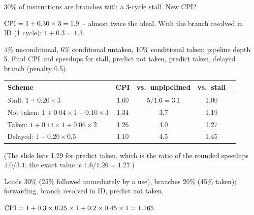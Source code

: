 \documentclass[11pt]{article}
\begin{document}
\begin{exercise}
30\% of instructions are branches with a 3-cycle stall. New CPI?
\end{exercise}
\begin{solution}
$\mathrm{CPI} = 1 + 0.30\times3 = 1.9$ -- almost twice the ideal. With the branch
resolved in ID (1 cycle): $1+0.3 = 1.3$.
\end{solution}

\begin{exercise}
4\% unconditional, 6\% conditional untaken, 10\% conditional taken;
pipeline depth 5. Find CPI and speedups for stall, predict not taken,
predict taken, delayed branch (penalty 0.5).
\end{exercise}
\begin{solution}
\begin{tabular}[t]{@{}lcccc@{}}
Scheme & CPI & vs.\ unpipelined & vs.\ stall \\
\hline
Stall: $1+0.20\times3$ & 1.60 & $5/1.6=3.1$ & 1.00 \\
Not taken: $1+0.04\times1+0.10\times3$ & 1.34 & 3.7 & 1.19 \\
Taken: $1+0.14\times1+0.06\times2$ & 1.26 & 4.0 & 1.27 \\
Delayed: $1+0.20\times0.5$ & 1.10 & 4.5 & 1.45 \\
\end{tabular}

(The slide lists 1.29 for predict taken, which is the ratio of the rounded
speedups $4.0/3.1$; the exact value is $1.6/1.26 = 1.27$.)
\end{solution}

\begin{exercise}
Loads 30\% (25\% followed immediately by a use), branches 20\% (45\%
taken); forwarding, branch resolved in ID, predict not taken.
\end{exercise}
\begin{solution}
$\mathrm{CPI} = 1 + 0.3\times0.25\times1 + 0.2\times0.45\times1 = 1.165$.
\end{solution}
\end{document}
